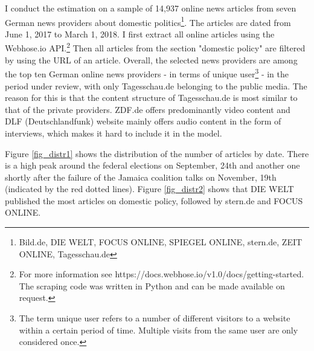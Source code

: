 \documentclass[12pt,a4paper,notitlepage]{article}
\begin{document}
I conduct the estimation on a sample of 14,937 online news articles from seven German news providers about domestic politics\footnote{Bild.de, DIE WELT, FOCUS ONLINE, SPIEGEL ONLINE, stern.de, ZEIT ONLINE, Tagesschau.de}. The articles are dated from June 1, 2017 to March 1, 2018. I first extract all online articles using the Webhose.io API.\footnote{For more information see https://docs.webhose.io/v1.0/docs/getting-started. The scraping code was written in Python and can be made available on request.} Then all articles from the section "domestic policy" are filtered by using the URL of an article. Overall, the selected news providers are among the top ten German online news providers - in terms of unique user\footnote{The term unique user refers to a number of different visitors to a website within a certain period of time. Multiple visits from the same user are only considered once.} - in the period under review, with only Tagesschau.de belonging to the public media. The reason for this is that the content structure of Tagesschau.de is most similar to that of the private providers. ZDF.de offers predominantly video content and DLF (Deutschlandfunk) website mainly offers audio content in the form of interviews, which makes it hard to include it in the model. 

 Figure \ref{fig_distr1} shows the distribution of the number of articles by date. There is a high peak around the federal elections on September, 24th and another one shortly after the failure of the Jamaica coalition talks on November, 19th (indicated by the red dotted lines). Figure \ref{fig_distr2} shows that DIE WELT published the most articles on domestic policy, followed by stern.de and FOCUS ONLINE.  
\end{document}
